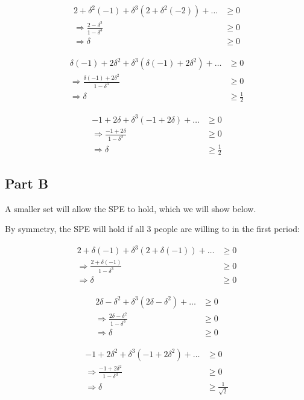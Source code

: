 \documentclass[11pt]{article} %
\begin{document}
\begin{align*}
2  + \delta^2(-1) +\delta^3(2  + \delta^2(-2) ) + \dots &\geq 0\\
\Rightarrow \frac{2-\delta^2}{1-\delta^3} &\geq 0\\
\Rightarrow \delta &\geq 0
\end{align*}

\begin{align*}
 \delta(-1) + 2\delta^2 +\delta^3(\delta(-1) + 2\delta^2 ) + \dots &\geq 0\\
\Rightarrow \frac{\delta(-1) +2 \delta^2}{1-\delta^3} &\geq 0\\
\Rightarrow \delta &\geq  \frac{1}{2}
\end{align*}

\begin{align*}
-1 + 2\delta   +\delta^3(-1 + 2\delta  ) + \dots &\geq 0\\
\Rightarrow \frac{-1 + 2\delta }{1-\delta^3} &\geq 0\\
\Rightarrow \delta &\geq \frac{1}{2}
\end{align*}

\subsection{Part B}
A smaller set will allow the SPE to hold, which we will show below.

By symmetry, the SPE will hold if all 3 people are willing to in the first period:

\begin{align*}
2  + \delta(-1) +\delta^3(2  + \delta(-1) ) + \dots &\geq 0\\
\Rightarrow \frac{2  + \delta(-1)}{1-\delta^3} &\geq 0\\
\Rightarrow \delta &\geq 0
\end{align*}

\begin{align*}
 2\delta -\delta^2 +\delta^3(2\delta -\delta^2  ) + \dots &\geq 0\\
\Rightarrow \frac{2\delta -\delta^2 }{1-\delta^3} &\geq 0\\
\Rightarrow \delta &\geq 0
\end{align*}

\begin{align*}
-1 + 2\delta^2   +\delta^3(-1 + 2\delta^2  ) + \dots &\geq 0\\
\Rightarrow \frac{-1 + 2\delta^2 }{1-\delta^3} &\geq 0\\
\Rightarrow \delta &\geq \frac{1}{\sqrt{2}}
\end{align*}
\end{document}
